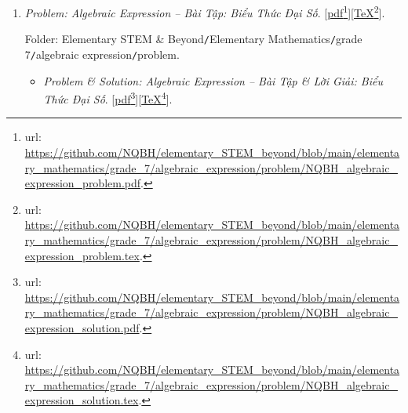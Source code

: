 \documentclass[12pt,oneside]{book}
\begin{document}
\begin{enumerate}
	Folder: {\sf Elementary STEM \& Beyond{\tt/}Elementary Mathematics{\tt/}grade 7{\tt/}probability \& statistics{\tt/}problem}.
	\begin{itemize}
		\item {\it Problem \& Solution: Probability \& Statistics -- Bài Tập \& Lời Giải: Xác Suất \& Thống Kê}. [\href{https://github.com/NQBH/elementary_STEM_beyond/blob/main/elementary_mathematics/grade_7/probability_statistics/solution/NQBH_probability_statistics_solution.pdf}{pdf}\footnote{{\sc url}: \url{https://github.com/NQBH/elementary_STEM_beyond/blob/main/elementary_mathematics/grade_7/probability_statistics/solution/NQBH_probability_statistics_solution.pdf}.}][\href{https://github.com/NQBH/elementary_STEM_beyond/blob/main/elementary_mathematics/grade_7/probability_statistics/solution/NQBH_probability_statistics_solution.tex}{\TeX}\footnote{{\sc url}: \url{https://github.com/NQBH/elementary_STEM_beyond/blob/main/elementary_mathematics/grade_7/probability_statistics/solution/NQBH_probability_statistics_solution.tex}.}].
		
		Folder: {\sf Elementary STEM \& Beyond{\tt/}Elementary Mathematics{\tt/}grade 7{\tt/}probability \& statistics{\tt/}solution}.
	\end{itemize}	
	
	\item {\it Problem: Algebraic Expression -- Bài Tập: Biểu Thức Đại Số}. [\href{https://github.com/NQBH/elementary_STEM_beyond/blob/main/elementary_mathematics/grade_7/algebraic_expression/problem/NQBH_algebraic_expression_problem.pdf}{pdf}\footnote{{\sc url}: \url{https://github.com/NQBH/elementary_STEM_beyond/blob/main/elementary_mathematics/grade_7/algebraic_expression/problem/NQBH_algebraic_expression_problem.pdf}.}][\href{https://github.com/NQBH/elementary_STEM_beyond/blob/main/elementary_mathematics/grade_7/algebraic_expression/problem/NQBH_algebraic_expression_problem.tex}{\TeX}\footnote{{\sc url}: \url{https://github.com/NQBH/elementary_STEM_beyond/blob/main/elementary_mathematics/grade_7/algebraic_expression/problem/NQBH_algebraic_expression_problem.tex}.}].
	
	Folder: {\sf Elementary STEM \& Beyond{\tt/}Elementary Mathematics{\tt/}grade 7{\tt/}algebraic expression{\tt/}problem}.
	\begin{itemize}
		\item {\it Problem \& Solution: Algebraic Expression -- Bài Tập \& Lời Giải: Biểu Thức Đại Số}. [\href{https://github.com/NQBH/elementary_STEM_beyond/blob/main/elementary_mathematics/grade_7/algebraic_expression/problem/NQBH_algebraic_expression_solution.pdf}{pdf}\footnote{{\sc url}: \url{https://github.com/NQBH/elementary_STEM_beyond/blob/main/elementary_mathematics/grade_7/algebraic_expression/problem/NQBH_algebraic_expression_solution.pdf}.}][\href{https://github.com/NQBH/elementary_STEM_beyond/blob/main/elementary_mathematics/grade_7/algebraic_expression/problem/NQBH_algebraic_expression_solution.tex}{\TeX}\footnote{{\sc url}: \url{https://github.com/NQBH/elementary_STEM_beyond/blob/main/elementary_mathematics/grade_7/algebraic_expression/problem/NQBH_algebraic_expression_solution.tex}.}].
		

\end{itemize}
\end{enumerate}
\end{document}

